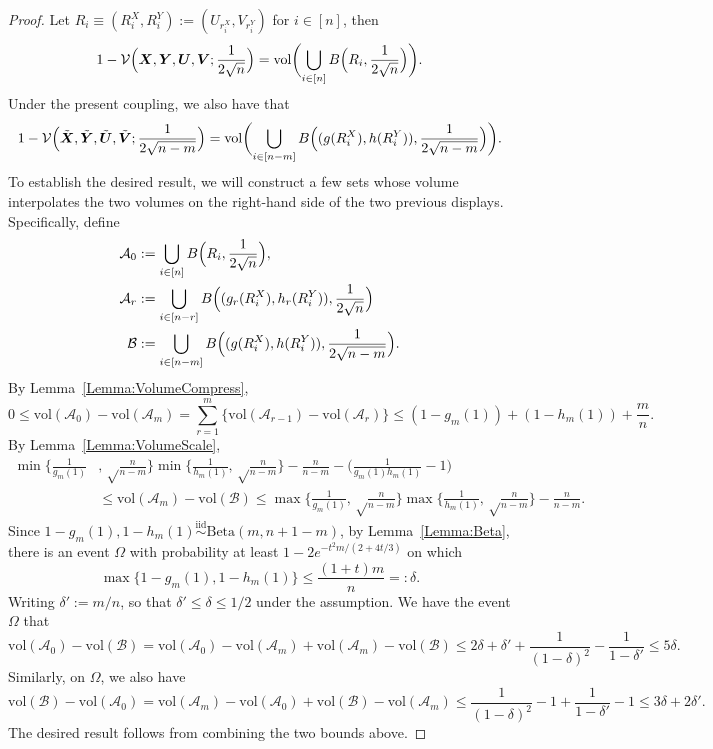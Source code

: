 \documentclass[11pt]{article}
\newcommand{\vol}{\mathrm{vol}}
\newcommand{\iid}{\stackrel{\mathrm{iid}}\sim}
\newcommand{\bs}[1]{\boldsymbol{#1}}
\begin{document}
\begin{proof}
Let $R_i \equiv (R^X_i, R^Y_i) := (U_{r^X_i}, V_{r^Y_i})$ for $i\in[n]$, then 
\[  
1- \mathcal{V}\Bigl(\bs{X},\bs{Y},\bs{U},\bs{V};\frac{1}{2\sqrt{n}}\Bigr) = \mathrm{vol} \biggl(\bigcup_{i\in[n]}B\Bigl(R_i, \frac{1}{2\sqrt{n}}\Bigr)\biggr).
\]
Under the present coupling, we also have that 
\[  
1 - \mathcal{V}\Bigl(\tilde{\bs{X}}, \tilde{\bs{Y}}, \tilde{\bs{U}}, \tilde{\bs{V}}; \frac{1}{2\sqrt{n-m}}\Bigr)  = \mathrm{vol}\biggl(\bigcup_{i\in[n-m]} B\Bigl((g(R^X_i), h(R^Y_i)), \frac{1}{2\sqrt{n-m}}\Bigr)\biggr).
\]
To establish the desired result, we will construct a few sets whose volume interpolates the two volumes on the right-hand side of the two previous displays. Specifically, define
\begin{align*}
\mathcal{A}_0&:=\bigcup_{i\in[n]}B\Bigl(R_i, \frac{1}{2\sqrt{n}}\Bigr),\\
\mathcal{A}_r&:=\bigcup_{i\in[n-r]}B\Bigl((g_r(R_i^X), h_r(R_i^Y)), \frac{1}{2\sqrt{n}}\Bigr)\\
\mathcal{B} &:= \bigcup_{i\in[n-m]} B\Bigl((g(R^X_i), h(R^Y_i)), \frac{1}{2\sqrt{n-m}}\Bigr).
\end{align*}
By Lemma~\ref{Lemma:VolumeCompress}, 
\[
0\leq \vol(\mathcal{A}_0)-\vol(\mathcal{A}_m) = \sum_{r=1}^m \bigl\{\mathrm{vol}(\mathcal{A}_{r-1}) - \mathrm{vol}(\mathcal{A}_r)\bigr\}\leq (1-g_m(1)) + (1-h_m(1)) +\frac{m}{n}.
\]
By Lemma~\ref{Lemma:VolumeScale},
\begin{align*}
\min\biggl\{\frac{1}{g_m(1)}&, \sqrt\frac{n}{n-m}\biggr\}\min\biggl\{ \frac{1}{h_m(1)},\sqrt\frac{n}{n-m}\biggr\}-\frac{n}{n-m}-\biggl(\frac{1}{g_m(1)h_m(1)}-1\biggr)\nonumber\\
&\leq \mathrm{vol}(\mathcal{A}_{m}) - \mathrm{vol}(\mathcal{B}) \leq \max\biggl\{\frac{1}{g_m(1)}, \sqrt\frac{n}{n-m}\biggr\}\max\biggl\{ \frac{1}{h_m(1)},\sqrt\frac{n}{n-m}\biggr\}-\frac{n}{n-m}.
\end{align*}
Since $1-g_m(1), 1-h_m(1)\iid \mathrm{Beta}(m,n+1-m)$,
by Lemma~\ref{Lemma:Beta}, there is an event $\Omega$ with probability at least $1 - 2e^{-t^2m/(2+4t/3)}$ on which 
\[
\max\{1-g_m(1), 1-h_m(1)\} \leq \frac{(1+t)m}{n} =: \delta.
\]
Writing $\delta' := m/n$, so that $\delta'\leq \delta \leq 1/2$ under the assumption. We have the event $\Omega$ that
\[  
\vol(\mathcal{A}_0)-\vol(\mathcal{B}) = \vol(\mathcal{A}_0) - \vol(\mathcal{A}_m) + \vol(\mathcal{A}_m) - \vol(\mathcal{B}) \leq 2\delta + \delta' + \frac{1}{(1-\delta)^2} - \frac{1}{1-\delta'}\leq 5\delta.
\]
Similarly, on $\Omega$, we also have
\[  
\vol(\mathcal{B}) - \vol(\mathcal{A}_0) =  \vol(\mathcal{A}_m) - \vol(\mathcal{A}_0) +  \vol(\mathcal{B}) -  \vol(\mathcal{A}_m) \leq \frac{1}{(1-\delta)^2}-1+\frac{1}{1-\delta'}-1 \leq 3\delta+2\delta'.
\]
The desired result follows from combining the two bounds above.
\end{proof}
\end{document}
